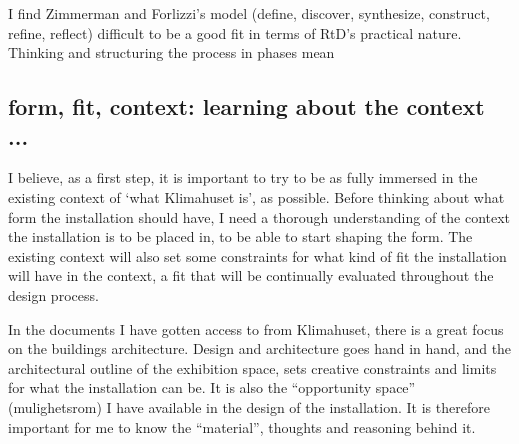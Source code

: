 I find Zimmerman and Forlizzi's model (define, discover, synthesize, construct, refine, reflect) difficult to be a good fit in terms of RtD's practical nature. Thinking and structuring the process in phases mean 


\subsection{form, fit, context: learning about the context ...}

I believe, as a first step, it is important to try to be as fully immersed in the existing context of ‘what Klimahuset is’, as possible. Before thinking about what form the installation should have, I need a thorough understanding of the context the installation is to be placed in, to be able to start shaping the form. The existing context will also set some constraints for what kind of fit the installation will have in the context, a fit that will be continually evaluated throughout the design process. 


In the documents I have gotten access to from Klimahuset, there is a great focus on the buildings architecture. Design and architecture goes hand in hand, and the architectural outline of the exhibition space, sets creative constraints and limits for what the installation can be. It is also the “opportunity space” (mulighetsrom) I have available in the design of the installation. It is therefore important for me to know the “material”, thoughts and reasoning behind it.